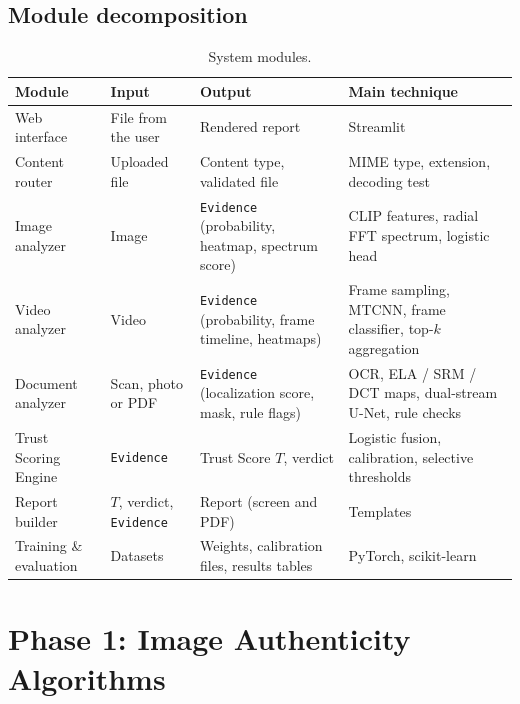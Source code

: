 \documentclass[11pt,a4paper]{article}
\begin{document}
\subsection{Module decomposition}

\begin{table}[htbp]
\centering
\small
\begin{tabularx}{\linewidth}{@{}l Y Y Y@{}}
\toprule
\textbf{Module} & \textbf{Input} & \textbf{Output} & \textbf{Main technique} \\
\midrule
Web interface & File from the user & Rendered report & Streamlit \\
Content router & Uploaded file & Content type, validated file & MIME type, extension, decoding test \\
Image analyzer & Image & \texttt{Evidence} (probability, heatmap, spectrum score) & CLIP features, radial FFT spectrum, logistic head \\
Video analyzer & Video & \texttt{Evidence} (probability, frame timeline, heatmaps) & Frame sampling, MTCNN, frame classifier, top-$k$ aggregation \\
Document analyzer & Scan, photo or PDF & \texttt{Evidence} (localization score, mask, rule flags) & OCR, ELA / SRM / DCT maps, dual-stream U-Net, rule checks \\
Trust Scoring Engine & \texttt{Evidence} & Trust Score $T$, verdict & Logistic fusion, calibration, selective thresholds \\
Report builder & $T$, verdict, \texttt{Evidence} & Report (screen and PDF) & Templates \\
Training \& evaluation & Datasets & Weights, calibration files, results tables & PyTorch, scikit-learn \\
\bottomrule
\end{tabularx}
\caption{System modules.}
\label{tab:modules}
\end{table}

\section{Phase 1: Image Authenticity Algorithms}
\label{sec:image}
\end{document}
